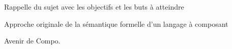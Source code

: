   Rappelle du sujet avec les objectifs et les buts à atteindre

  Approche originale de la sémantique formelle d'un langage à composant 
  
  Avenir de Compo.
